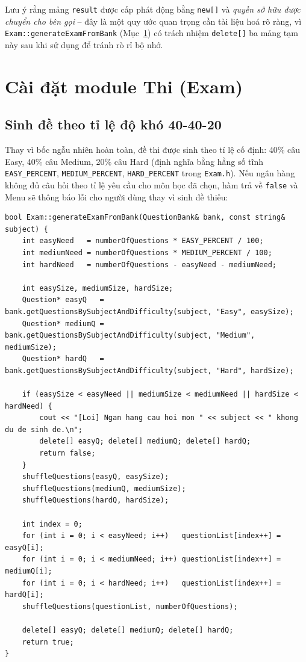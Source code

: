 \documentclass[11pt]{report}
\begin{document}
Lưu ý rằng mảng \texttt{result} được cấp phát động bằng \texttt{new[]} và \textit{quyền sở hữu được chuyển cho bên gọi} -- đây là một quy ước quan trọng cần tài liệu hoá rõ ràng, vì \texttt{Exam::generateExamFromBank} (Mục~\ref{sec:caidat_exam}) có trách nhiệm \texttt{delete[]} ba mảng tạm này sau khi sử dụng để tránh rò rỉ bộ nhớ.

\section{Cài đặt module Thi (Exam)}
\label{sec:caidat_exam}

\subsection{Sinh đề theo tỉ lệ độ khó 40-40-20}

Thay vì bốc ngẫu nhiên hoàn toàn, đề thi được sinh theo tỉ lệ cố định: 40\% câu Easy, 40\% câu Medium, 20\% câu Hard (định nghĩa bằng hằng số tĩnh \texttt{EASY\_PERCENT}, \texttt{MEDIUM\_PERCENT}, \texttt{HARD\_PERCENT} trong \texttt{Exam.h}). Nếu ngân hàng không đủ câu hỏi theo tỉ lệ yêu cầu cho môn học đã chọn, hàm trả về \texttt{false} và Menu sẽ thông báo lỗi cho người dùng thay vì sinh đề thiếu:

\begin{lstlisting}[caption={Sinh đề theo tỉ lệ độ khó (Exam.cpp)}, label={lst:exam_generate}]
bool Exam::generateExamFromBank(QuestionBank& bank, const string& subject) {
    int easyNeed   = numberOfQuestions * EASY_PERCENT / 100;
    int mediumNeed = numberOfQuestions * MEDIUM_PERCENT / 100;
    int hardNeed   = numberOfQuestions - easyNeed - mediumNeed;

    int easySize, mediumSize, hardSize;
    Question* easyQ   = bank.getQuestionsBySubjectAndDifficulty(subject, "Easy", easySize);
    Question* mediumQ = bank.getQuestionsBySubjectAndDifficulty(subject, "Medium", mediumSize);
    Question* hardQ   = bank.getQuestionsBySubjectAndDifficulty(subject, "Hard", hardSize);

    if (easySize < easyNeed || mediumSize < mediumNeed || hardSize < hardNeed) {
        cout << "[Loi] Ngan hang cau hoi mon " << subject << " khong du de sinh de.\n";
        delete[] easyQ; delete[] mediumQ; delete[] hardQ;
        return false;
    }
    shuffleQuestions(easyQ, easySize);
    shuffleQuestions(mediumQ, mediumSize);
    shuffleQuestions(hardQ, hardSize);

    int index = 0;
    for (int i = 0; i < easyNeed; i++)   questionList[index++] = easyQ[i];
    for (int i = 0; i < mediumNeed; i++) questionList[index++] = mediumQ[i];
    for (int i = 0; i < hardNeed; i++)   questionList[index++] = hardQ[i];
    shuffleQuestions(questionList, numberOfQuestions);

    delete[] easyQ; delete[] mediumQ; delete[] hardQ;
    return true;
}
\end{lstlisting}
\end{document}
